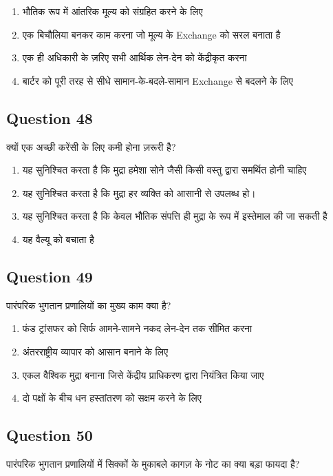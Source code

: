 \documentclass[12pt,a4paper]{article}
\begin{document}
\begin{enumerate}[label=\Alph*., leftmargin=*]
\item भौतिक रूप में आंतरिक मूल्य को संग्रहित करने के लिए
\item एक बिचौलिया बनकर काम करना जो मूल्य के Exchange को सरल बनाता है
\item एक ही अधिकारी के ज़रिए सभी आर्थिक लेन-देन को केंद्रीकृत करना
\item बार्टर को पूरी तरह से सीधे सामान-के-बदले-सामान Exchange से बदलने के लिए
\end{enumerate}

\bigskip


\subsection*{Question 48}
क्यों एक अच्छी करेंसी के लिए कमी होना ज़रूरी है?

\begin{enumerate}[label=\Alph*., leftmargin=*]
\item यह सुनिश्चित करता है कि मुद्रा हमेशा सोने जैसी किसी वस्तु द्वारा समर्थित होनी चाहिए
\item यह सुनिश्चित करता है कि मुद्रा हर व्यक्ति को आसानी से उपलब्ध हो।
\item यह सुनिश्चित करता है कि केवल भौतिक संपत्ति ही मुद्रा के रूप में इस्तेमाल की जा सकती है
\item यह वैल्यू को बचाता है
\end{enumerate}

\bigskip


\subsection*{Question 49}
पारंपरिक भुगतान प्रणालियों का मुख्य काम क्या है?

\begin{enumerate}[label=\Alph*., leftmargin=*]
\item फंड ट्रांसफर को सिर्फ आमने-सामने नकद लेन-देन तक सीमित करना
\item अंतरराष्ट्रीय व्यापार को आसान बनाने के लिए
\item एकल वैश्विक मुद्रा बनाना जिसे केंद्रीय प्राधिकरण द्वारा नियंत्रित किया जाए
\item दो पक्षों के बीच धन हस्तांतरण को सक्षम करने के लिए
\end{enumerate}

\bigskip


\subsection*{Question 50}
पारंपरिक भुगतान प्रणालियों में सिक्कों के मुकाबले कागज़ के नोट का क्या बड़ा फायदा है?
\end{document}
